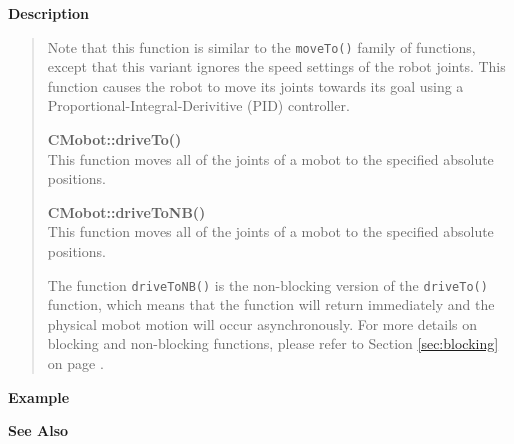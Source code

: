 {\bf Description}\\
\vspace{-12pt}
\begin{quote}
Note that this function is similar to the \texttt{moveTo()} family of functions, except
that this variant ignores the speed settings of the robot joints. This function causes
the robot to move its joints towards its goal using a Proportional-Integral-Derivitive (PID)
controller.

{\bf CMobot::driveTo()}\\
This function moves all of the joints of a mobot to the specified absolute positions. 

{\bf CMobot::driveToNB()}\\
This function moves all of the joints of a mobot to the specified absolute positions. 

The function \texttt{driveToNB()} is the non-blocking version of
the \texttt{driveTo()} function, which means that the function will return
immediately and the physical mobot motion will occur asynchronously. For
more details on blocking and non-blocking functions, please refer to 
Section \ref{sec:blocking} on page \pageref{sec:blocking}.\\
\end{quote}

\noindent
{\bf Example}\\
\noindent

\noindent
{\bf See Also}\\

